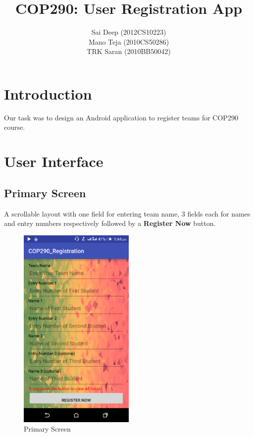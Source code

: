 \documentclass[12pt]{article}
\title{COP290: User Registration App}
\author{Sai Deep (2012CS10223) \\ Mano Teja (2010CS50286) \\ TRK Saran (2010BB50042) }
\begin{document}
\maketitle
\tableofcontents

\section{Introduction}
Our task was to design an Android application to register teams for COP290 course.
\section{User Interface}
\subsection{Primary Screen}
A scrollable layout with one field for entering team name, 3 fields each for names and entry numbers respectively followed by a \textbf{Register Now} button. 
\begin{figure}[!ht]
	\centering
	\includegraphics[width=0.5\textwidth]{images/home.png}
	\caption{Primary Screen}
\end{figure}
\end{document}
